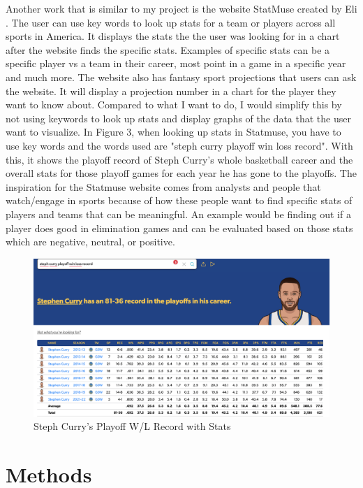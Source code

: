 \documentclass[10pt,twocolumn]{article}
\begin{document}
Another work that is similar to my project is the website StatMuse created by Eli 
\textcite{statmuse}.
The user can use key words to look up stats for a team or players across all sports in America. It displays the stats the the user was looking for in a chart after the website finds the specific stats. Examples of specific stats can be a specific player vs a team in their career, most point in a game in a specific year and much more. The website also has fantasy sport projections that users can ask the website. It will display a projection number in a chart for the player they want to know about. Compared to what I want to do, I would simplify this by not using keywords to look up stats and display graphs of the data that the user want to visualize. In Figure 3, when looking up stats in Statmuse, you have to use key words and the words used are "steph curry playoff win loss record". With this, it shows the playoff record of Steph Curry's whole basketball career and the overall stats for those playoff games for each year he has gone to the playoffs. The inspiration for the Statmuse website comes from analysts and people that watch/engage in sports because of how these people want to find specific stats of players and teams that can be meaningful. An example would be finding out if a player does good in elimination games and can be evaluated based on those stats which are negative, neutral, or positive. 

\begin{figure}
    \centering
    \includegraphics[width=.98\linewidth]{StatsMuse_Curry.png}
    \caption{
        Steph Curry's Playoff W/L Record with Stats
    }
    \label{fig:second-page-2}
\end{figure}

\section{Methods}
\end{document}
